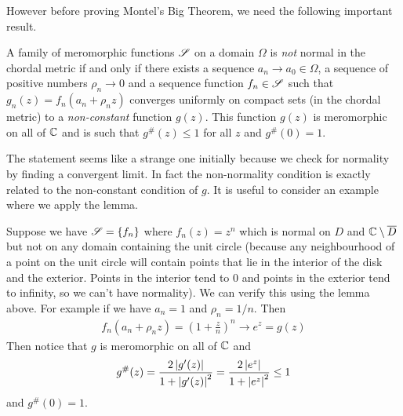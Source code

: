 However before proving Montel's Big Theorem, we need the following important result.
\begin{lemma}\label{lem:zalcman}
    A family of meromorphic functions $\mathscr{S}$ on a domain $\Omega$ is \textit{not} normal in the chordal metric if and only if there exists a sequence $a_n \to a_{0} \in \Omega$, a sequence of positive numbers $\rho_n \to 0$ and a sequence function $f_n \in \mathscr{S}$ such that $g_n(z) = f_n(a_n + \rho_n z)$ converges uniformly on compact sets (in the chordal metric) to a \textit{non-constant} function $g(z)$. This function $g(z)$ is meromorphic on all of $\mathbb{C}$ and is such that $g^\#(z) \leq 1$ for all $z$ and $g^\#(0) = 1$.
\end{lemma}

The statement seems like a strange one initially because we check for normality by finding a convergent limit. In fact the non-normality condition is exactly related to the non-constant condition of $g$. It is useful to consider an example where we apply the lemma.
\begin{example}
    Suppose we have $\mathscr{S} = \{f_n\}$ where $f_n(z) = z^n$ which is normal on $D$ and $\mathbb{C} \setminus \overline{D}$ but not on any domain containing the unit circle (because any neighbourhood of a point on the unit circle will contain points that lie in the interior of the disk and the exterior. Points in the interior tend to 0 and points in the exterior tend to infinity, so we can't have normality). We can verify this using the lemma above. For example if we have $a_n = 1$ and $\rho_n = 1/n$. Then
    \begin{align*}
        f_n(a_n + \rho_n z) = \left(1 + \frac{z}{n}\right)^n \to e^z = g(z)
    \end{align*}
    Then notice that $g$ is meromorphic on all of $\mathbb{C}$ and 
    \begin{align*}
        g^\#(z) = \frac{2\left|g'(z)\right|}{1 + \left|g'(z)\right|^2} = \frac{2\left|e^z\right|}{1 + \left|e^z\right|^2} \leq 1
    \end{align*}
    and $g^\#(0) = 1$. 
\end{example}

